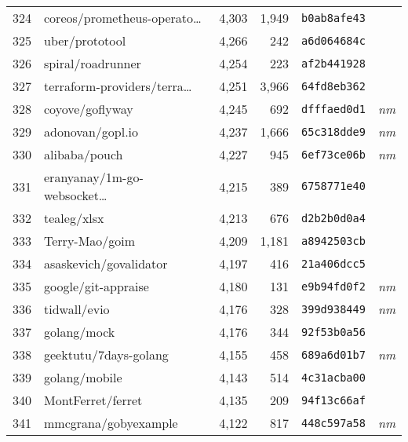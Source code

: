 {\begin{supertabular}{llrrll}
        324 &    coreos/prometheus-operato\ldots &  4,303 &  1,949 &  \texttt{b0ab8afe43} &              \\
        325 &                     uber/prototool &  4,266 &    242 &  \texttt{a6d064684c} &              \\
        326 &                  spiral/roadrunner &  4,254 &    223 &  \texttt{af2b441928} &              \\
        327 &    terraform-providers/terra\ldots &  4,251 &  3,966 &  \texttt{64fd8eb362} &              \\
        328 &                    coyove/goflyway &  4,245 &    692 &  \texttt{dfffaed0d1} &  \textit{nm} \\
        329 &                   adonovan/gopl.io &  4,237 &  1,666 &  \texttt{65c318dde9} &  \textit{nm} \\
        330 &                      alibaba/pouch &  4,227 &    945 &  \texttt{6ef73ce06b} &  \textit{nm} \\
        331 &    eranyanay/1m-go-websocket\ldots &  4,215 &    389 &  \texttt{6758771e40} &              \\
        332 &                        tealeg/xlsx &  4,213 &    676 &  \texttt{d2b2b0d0a4} &              \\
        333 &                     Terry-Mao/goim &  4,209 &  1,181 &  \texttt{a8942503cb} &              \\
        334 &             asaskevich/govalidator &  4,197 &    416 &  \texttt{21a406dcc5} &              \\
        335 &                google/git-appraise &  4,180 &    131 &  \texttt{e9b94fd0f2} &  \textit{nm} \\
        336 &                       tidwall/evio &  4,176 &    328 &  \texttt{399d938449} &  \textit{nm} \\
        337 &                        golang/mock &  4,176 &    344 &  \texttt{92f53b0a56} &              \\
        338 &              geektutu/7days-golang &  4,155 &    458 &  \texttt{689a6d01b7} &  \textit{nm} \\
        339 &                      golang/mobile &  4,143 &    514 &  \texttt{4c31acba00} &              \\
        340 &                  MontFerret/ferret &  4,135 &    209 &  \texttt{94f13c66af} &              \\
        341 &               mmcgrana/gobyexample &  4,122 &    817 &  \texttt{448c597a58} &  \textit{nm} \\

\end{supertabular}}
